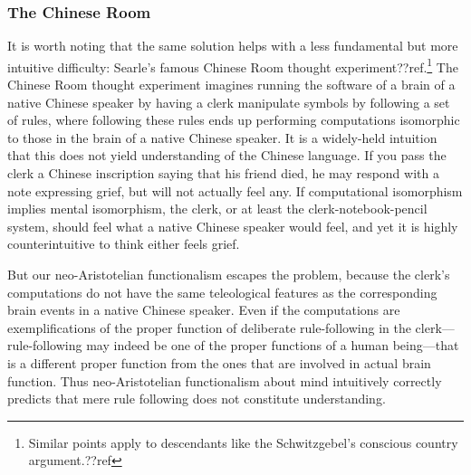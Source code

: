 \subsubsection{The Chinese Room}
It is worth noting that the same solution helps with a less fundamental but more intuitive difficulty:
Searle's famous Chinese Room thought experiment??ref.\footnote{Similar points apply to descendants 
like the Schwitzgebel's conscious country
argument.??ref} The Chinese Room thought experiment imagines running the software of a brain of a native Chinese speaker 
by having a clerk manipulate symbols by following a set of rules, where following these rules ends up performing
computations isomorphic to those in the brain of a native Chinese speaker. It is a widely-held intuition that
this does not yield understanding of the Chinese
language. If you pass the clerk a Chinese inscription saying that his friend
died, he may respond with a note expressing grief, but will not actually feel any. If computational isomorphism
implies mental isomorphism, the clerk, or at least the clerk-notebook-pencil system, should feel what a native
Chinese speaker would feel, and yet it is highly counterintuitive to think either feels grief.

But our neo-Aristotelian functionalism escapes the problem, because the clerk's computations do not have 
the same teleological features as the corresponding brain events in a native Chinese speaker. Even if the computations
are exemplifications of the proper function of deliberate rule-following in the clerk---rule-following may 
indeed be one of the proper functions of a human being---that is a different proper function from the ones that 
are involved in actual brain function. Thus neo-Aristotelian functionalism about mind intuitively correctly predicts that
mere rule following does not constitute understanding.

